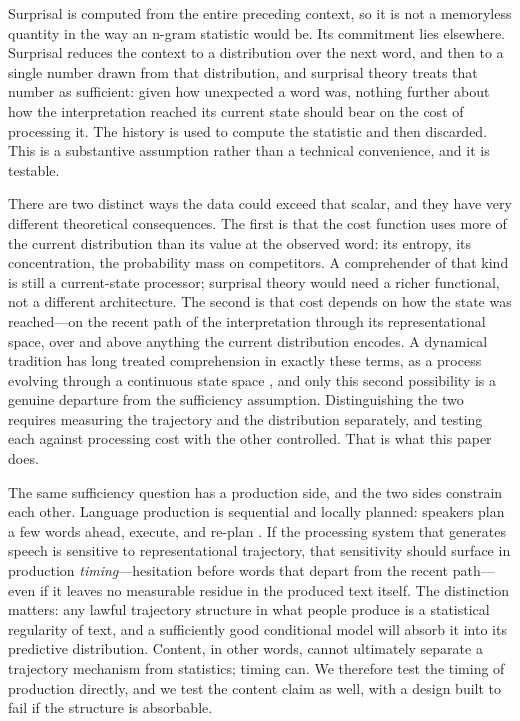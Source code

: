 \documentclass[12pt]{article}
\newcommand{\new}[1]{#1}   %
\begin{document}
\new{Surprisal is computed from the entire preceding context, so it is not a memoryless quantity in the way an n-gram statistic would be. Its commitment lies elsewhere. Surprisal reduces the context to a distribution over the next word, and then to a single number drawn from that distribution, and surprisal theory treats that number as sufficient: given how unexpected a word was, nothing further about how the interpretation reached its current state should bear on the cost of processing it. The history is used to compute the statistic and then discarded. This is a substantive assumption rather than a technical convenience, and it is testable.}

\new{There are two distinct ways the data could exceed that scalar, and they have very different theoretical consequences. The first is that the cost function uses more of the current distribution than its value at the observed word: its entropy, its concentration, the probability mass on competitors. A comprehender of that kind is still a current-state processor; surprisal theory would need a richer functional, not a different architecture. The second is that cost depends on how the state was reached---on the recent path of the interpretation through its representational space, over and above anything the current distribution encodes. A dynamical tradition has long treated comprehension in exactly these terms, as a process evolving through a continuous state space \citep{tabor1999,spivey2007,cho2017}, and only this second possibility is a genuine departure from the sufficiency assumption. Distinguishing the two requires measuring the trajectory and the distribution separately, and testing each against processing cost with the other controlled. That is what this paper does.}

\new{The same sufficiency question has a production side, and the two sides constrain each other. Language production is sequential and locally planned: speakers plan a few words ahead, execute, and re-plan \citep{levelt1989,ferreira2002}. If the processing system that generates speech is sensitive to representational trajectory, that sensitivity should surface in production \emph{timing}---hesitation before words that depart from the recent path---even if it leaves no measurable residue in the produced text itself. The distinction matters: any lawful trajectory structure in what people produce is a statistical regularity of text, and a sufficiently good conditional model will absorb it into its predictive distribution. Content, in other words, cannot ultimately separate a trajectory mechanism from statistics; timing can. We therefore test the timing of production directly, and we test the content claim as well, with a design built to fail if the structure is absorbable.}
\end{document}
